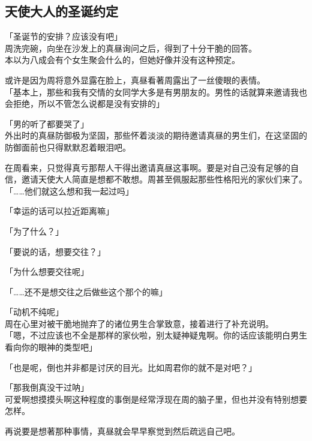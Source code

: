 \subsection{天使大人的圣诞约定}

「圣诞节的安排？应该没有吧」\\

周洗完碗，向坐在沙发上的真昼询问之后，得到了十分干脆的回答。\\

本以为八成会有个女生聚会什么的，但她好像并没有这种预定。

或许是因为周将意外显露在脸上，真昼看著周露出了一丝傻眼的表情。\\

「基本上，那些和我有交情的女同学大多是有男朋友的。男性的话就算来邀请我也会拒绝，所以不管怎么说都是没有安排的」

「男的听了都要哭了」\\

外出时的真昼防御极为坚固，那些怀着淡淡的期待邀请真昼的男生们，在这坚固的防御面前也只得默默忍着眼泪吧。

在周看来，只觉得真亏那帮人干得出邀请真昼这事啊。要是对自己没有足够的自信，邀请天使大人简直是想都不敢想。周甚至佩服起那些性格阳光的家伙们来了。\\

「……他们就这么想和我一起过吗」

「幸运的话可以拉近距离嘛」

「为了什么？」

「要说的话，想要交往？」

「为什么想要交往呢」

「……还不是想交往之后做些这个那个的嘛」

「动机不纯呢」\\

周在心里对被干脆地抛弃了的诸位男生合掌致意，接着进行了补充说明。\\

「嗯，不过应该也不全是那样的家伙啦，别太疑神疑鬼啊。你的话应该能明白男生看向你的眼神的类型吧」

「也是呢，倒也并非都是讨厌的目光。比如周君你的就不是对吧？」

「那我倒真没干过呐」\\%

可爱啊想摸摸头啊这种程度的事倒是经常浮现在周的脑子里，但也并没有特别想要怎样。

再说要是想著那种事情，真昼就会早早察觉到然后疏远自己吧。\\

